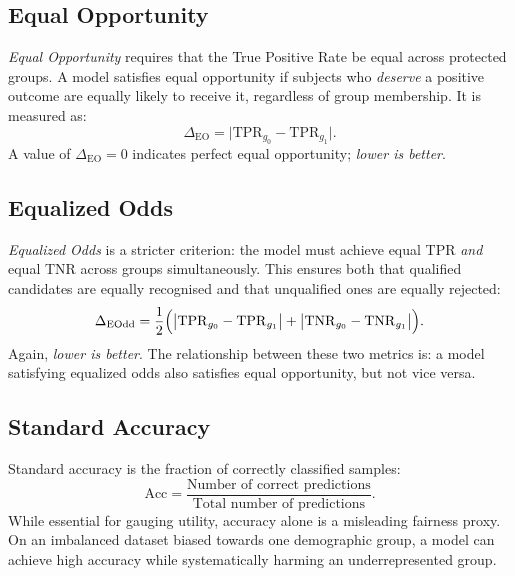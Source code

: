 \subsection{Equal Opportunity}
\label{subsec:equal_opp}

\emph{Equal Opportunity} \cite{hardt2016} requires that the
True Positive Rate be equal across protected groups.  A model
satisfies equal opportunity if subjects who \emph{deserve} a
positive outcome are equally likely to receive it, regardless
of group membership.  It is measured as:
\begin{equation}
  \Delta_{\mathrm{EO}}
  = \bigl|\mathrm{TPR}_{g_0} - \mathrm{TPR}_{g_1}\bigr|.
  \label{eq:equal_opp}
\end{equation}
A value of $\Delta_{\mathrm{EO}} = 0$ indicates perfect equal
opportunity; \emph{lower is better}.

\subsection{Equalized Odds}
\label{subsec:equalized_odds}

\emph{Equalized Odds} \cite{hardt2016} is a stricter criterion:
the model must achieve equal TPR \emph{and} equal TNR across
groups simultaneously.  This ensures both that qualified
candidates are equally recognised and that unqualified ones are
equally rejected:
\begin{equation}
  \Delta_{\mathrm{EOdd}}
  = \frac{1}{2}\Bigl(
      \bigl|\mathrm{TPR}_{g_0} - \mathrm{TPR}_{g_1}\bigr|
      +
      \bigl|\mathrm{TNR}_{g_0} - \mathrm{TNR}_{g_1}\bigr|
    \Bigr).
  \label{eq:equalized_odds}
\end{equation}
Again, \emph{lower is better}.  The relationship between these
two metrics is: a model satisfying equalized odds also satisfies
equal opportunity, but not vice versa.

\subsection{Standard Accuracy}
\label{subsec:accuracy}

Standard accuracy is the fraction of correctly classified samples:
\begin{equation}
  \mathrm{Acc}
  = \frac{\text{Number of correct predictions}}
         {\text{Total number of predictions}}.
  \label{eq:accuracy}
\end{equation}
While essential for gauging utility, accuracy alone is a misleading
fairness proxy.  On an imbalanced dataset biased towards one
demographic group, a model can achieve high accuracy while
systematically harming an underrepresented group.

